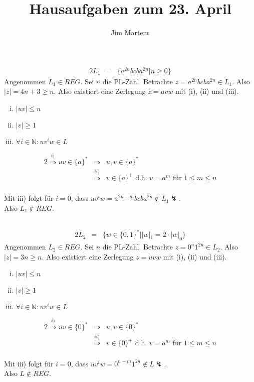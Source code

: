 \documentclass[10pt,a4paper,oneside,ngerman,numbers=noenddot]{scrartcl}
\begin{document}
\author{Jim Martens}
\title{Hausaufgaben zum 23. April}
\maketitle
\section{} %
\subsection{} %
\begin{alignat*}{2}
L_{1} &=& \{a^{2n}bcba^{2n} | n \geq 0 \}
\end{alignat*}
Angenommen $L_{1} \in REG$. Sei $n$ die PL-Zahl. Betrachte $z = a^{2n}bcba^{2n} \in L_{1}$. Also $|z| = 4n + 3 \geq n$. Also existiert eine Zerlegung $z = uvw$ mit (i), (ii) und (iii).\\
\begin{enumerate}[i)]
	\item $|uv| \leq n$ 
	\item $|v| \geq 1$
	\item $\forall i \in \mathbb{N}: uv^{i}w \in L$
\end{enumerate}
\begin{alignat*}{2}
\overset{i)}{\Rightarrow} uv \in \{a\}^{*} &\Rightarrow & u,v \in \{a\}^{*} \\
&\overset{ii)}{\Rightarrow} & v \in \{a\}^{+} \text{ d.h. } v=a^{m} \text{ für } 1 \leq m \leq n
\end{alignat*}\\
Mit iii) folgt für $i = 0$, dass $uv^{i}w = a^{2n-m}bcba^{2n} \not\in L_{1} \lightning$.\\
Also $L_{1} \not\in REG$.
\subsection{} %
\begin{alignat*}{2}
L_{2} &=& \{w \in \{0,1\}^{*} | |w|_{1} = 2 \cdot |w|_{0} \}
\end{alignat*}
Angenommen $L_{2} \in REG$. Sei $n$ die PL-Zahl. Betrachte $z = 0^{n}1^{2n} \in L_{2}$. Also $|z| = 3n \geq n$. Also existiert eine Zerlegung $z = uvw$ mit (i), (ii) und (iii).\\
\begin{enumerate}[i)]
	\item $|uv| \leq n$ 
	\item $|v| \geq 1$
	\item $\forall i \in \mathbb{N}: uv^{i}w \in L$
\end{enumerate}
\begin{alignat*}{2}
\overset{i)}{\Rightarrow} uv \in \{0\}^{*} &\Rightarrow & u,v \in \{0\}^{*} \\
&\overset{ii)}{\Rightarrow} & v \in \{0\}^{+} \text{ d.h. } v=a^{m} \text{ für } 1 \leq m \leq n
\end{alignat*}\\
Mit iii) folgt für $i = 0$, dass $uv^{i}w = 0^{n-m}1^{2n} \not\in L \lightning$.\\
Also $L \not\in REG$.
\end{document}
